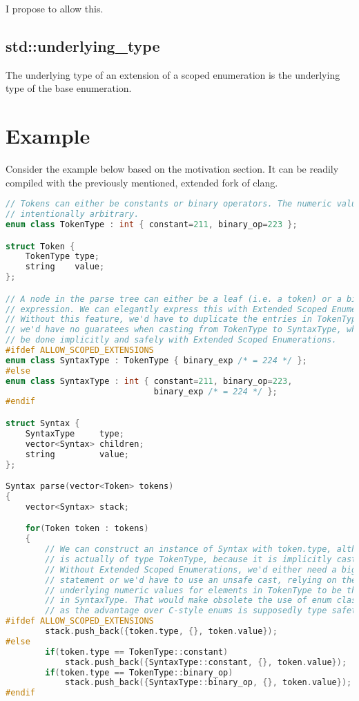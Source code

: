 \documentclass{scrartcl}
\begin{document}
I propose to allow this.

\subsection*{std::underlying\_type}
The underlying type of an extension of a scoped enumeration is the underlying type of the base enumeration.

\newpage
\section*{Example}
Consider the example below based on the motivation section.
It can be readily compiled with the previously mentioned, extended fork of clang.

{\footnotesize
\begin{lstlisting}[language=C++]
// Tokens can either be constants or binary operators. The numeric values are
// intentionally arbitrary.
enum class TokenType : int { constant=211, binary_op=223 };

struct Token {
    TokenType type;
    string    value;
};

// A node in the parse tree can either be a leaf (i.e. a token) or a binary
// expression. We can elegantly express this with Extended Scoped Enumerations.
// Without this feature, we'd have to duplicate the entries in TokenType and
// we'd have no guaratees when casting from TokenType to SyntaxType, which can
// be done implicitly and safely with Extended Scoped Enumerations.
#ifdef ALLOW_SCOPED_EXTENSIONS
enum class SyntaxType : TokenType { binary_exp /* = 224 */ };
#else
enum class SyntaxType : int { constant=211, binary_op=223,
                              binary_exp /* = 224 */ };
#endif

struct Syntax {
    SyntaxType     type;
    vector<Syntax> children;
    string         value;
};

Syntax parse(vector<Token> tokens)
{
    vector<Syntax> stack;

    for(Token token : tokens)
    {
        // We can construct an instance of Syntax with token.type, although it
        // is actually of type TokenType, because it is implicitly cast.
        // Without Extended Scoped Enumerations, we'd either need a big switch
        // statement or we'd have to use an unsafe cast, relying on the
        // underlying numeric values for elements in TokenType to be the same as
        // in SyntaxType. That would make obsolete the use of enum class,
        // as the advantage over C-style enums is supposedly type safety.
#ifdef ALLOW_SCOPED_EXTENSIONS
        stack.push_back({token.type, {}, token.value});
#else
        if(token.type == TokenType::constant)
            stack.push_back({SyntaxType::constant, {}, token.value});
        if(token.type == TokenType::binary_op)
            stack.push_back({SyntaxType::binary_op, {}, token.value});
#endif


\end{lstlisting}}
\end{document}
